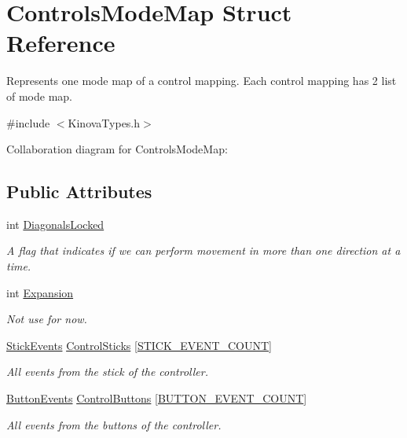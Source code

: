 \hypertarget{struct_controls_mode_map}{}\section{Controls\+Mode\+Map Struct Reference}
\label{struct_controls_mode_map}


Represents one mode map of a control mapping. Each control mapping has 2 list of mode map.  




{\ttfamily \#include $<$Kinova\+Types.\+h$>$}



Collaboration diagram for Controls\+Mode\+Map\+:
\subsection*{Public Attributes}
\begin{DoxyCompactItemize}
\item 
int \hyperlink{struct_controls_mode_map_af46c342653f85b90f59c677972c2e905}{Diagonals\+Locked}
\begin{DoxyCompactList}\small\item\em A flag that indicates if we can perform movement in more than one direction at a time. \end{DoxyCompactList}\item 
int \hyperlink{struct_controls_mode_map_a3fc6f2f0246d5ed5b4cf1635fb073c91}{Expansion}
\begin{DoxyCompactList}\small\item\em Not use for now. \end{DoxyCompactList}\item 
\hyperlink{struct_stick_events}{Stick\+Events} \hyperlink{struct_controls_mode_map_a022bc6ccf4b8c655b152d134c4738b1c}{Control\+Sticks} \mbox{[}\hyperlink{_kinova_types_8h_a1b14727ca81e530c9b63be023d70fe1c}{S\+T\+I\+C\+K\+\_\+\+E\+V\+E\+N\+T\+\_\+\+C\+O\+U\+NT}\mbox{]}
\begin{DoxyCompactList}\small\item\em All events from the stick of the controller. \end{DoxyCompactList}\item 
\hyperlink{struct_button_events}{Button\+Events} \hyperlink{struct_controls_mode_map_a3b54c773477b561b1fbc505556251717}{Control\+Buttons} \mbox{[}\hyperlink{_kinova_types_8h_a07e5dbf5fed1737edf7b518c431e8eaf}{B\+U\+T\+T\+O\+N\+\_\+\+E\+V\+E\+N\+T\+\_\+\+C\+O\+U\+NT}\mbox{]}
\begin{DoxyCompactList}\small\item\em All events from the buttons of the controller. \end{DoxyCompactList}\end{DoxyCompactItemize}


